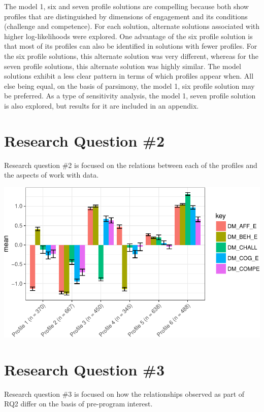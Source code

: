 \documentclass[]{msu-thesis}
\theoremstyle{definition}
\theoremstyle{definition}
\theoremstyle{definition}
\theoremstyle{remark}
\begin{document}
The model 1, six and seven profile solutions are compelling because both
show profiles that are distinguished by dimensions of engagement and its
conditions (challenge and competence). For each solution, alternate
solutions associated with higher log-likelihoods were explored. One
advantage of the six profile solution is that most of its profiles can
also be identified in solutions with fewer profiles. For the six profile
solutions, this alternate solution was very different, whereas for the
seven profile solutions, this alternate solution was highly similar. The
model solutions exhibit a less clear pattern in terms of which profiles
appear when. All else being equal, on the basis of parsimony, the model
1, six profile solution may be preferred. As a type of sensitivity
analysis, the model 1, seven profile solution is also explored, but
results for it are included in an appendix.

\section{Research Question \#2}\label{research-question-2}

Research question \#2 is focused on the relations between each of the
profiles and the aspects of work with data.

\begin{center}\includegraphics[width=0.8\linewidth]{rosenberg-dissertation_files/figure-latex/rq2-proc-1} \end{center}

\section{Research Question \#3}\label{research-question-3}

Research question \#3 is focused on how the relationships observed as
part of RQ2 differ on the basis of pre-program interest.
\end{document}
